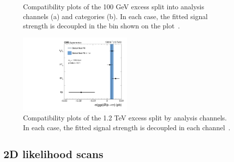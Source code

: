 \begin{figure}[!hbtp]
\centering
\caption{Compatibility plots of the 100 GeV excess split into analysis channels (a) and categories (b). In each case, the fitted signal strength is decoupled in the bin shown on the plot~\cite{CMS:2022rbd}.}
\label{fig:low_mass_compatibility}
\end{figure}

\begin{figure}[!hbtp]
\centering
    \includegraphics[width=0.5\textwidth]{Figures/ccc_fit_result_mH1200_per-channel.pdf}
\caption{Compatibility plots of the 1.2 TeV excess split by analysis channels. In each case, the fitted signal strength is decoupled in each channel~\cite{CMS:2022rbd}.}
\label{fig:high_mass_compatibility}
\end{figure}

\subsection{2D likelihood scans}

